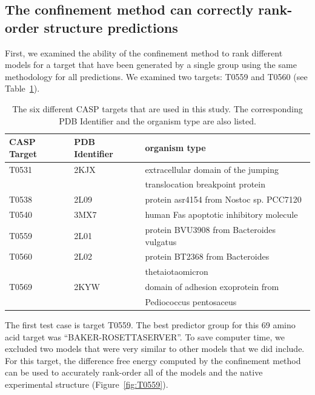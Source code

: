 \documentclass[12pt]{article}
\begin{document}
\subsection*{The confinement method can correctly rank-order structure predictions}

First, we examined the ability of the confinement method to rank different models for a target that have been generated
by a single group using the same methodology for all predictions. We examined two targets: T0559 and T0560 (see Table~\ref{table:casp_testcase}). 


\begin{table}
\begin{center}
\caption{The six different CASP targets that are used in this study. The corresponding PDB Identifier and the 
         organism type are also listed.}
\label{table:casp_testcase}
\begin{tabular}{l l l}\hline
    CASP Target  & PDB Identifier &  organism type  \\ \hline
     T0531       &    2KJX        &  extracellular domain of the jumping  \\
                 &                &  translocation breakpoint protein  \\ \hline
     T0538       &    2L09        &  protein asr4154 from Nostoc sp. PCC7120     \\ \hline
     T0540       &    3MX7        &  human Fas apoptotic inhibitory molecule     \\ \hline
     T0559       &    2L01        &  protein BVU3908 from Bacteroides vulgatus   \\ \hline
     T0560       &    2L02        &  protein BT2368 from Bacteroides  \\ 
                 &                &  thetaiotaomicron         \\ \hline
     T0569       &    2KYW        &  domain of adhesion exoprotein from \\ 
                 &                &   Pediococcus pentosaceus \\ \hline
\end{tabular}
\end{center}
\end{table}


The first test case is target T0559. The best predictor group for this 69 amino acid target was ``BAKER-ROSETTASERVER''.
To save computer time, we excluded two models that were very similar to other models that we did include. For this
target, the difference free energy computed by the confinement method can be used to accurately rank-order all of the
models and the native experimental structure (Figure~\ref{fig:T0559}).
\end{document}

